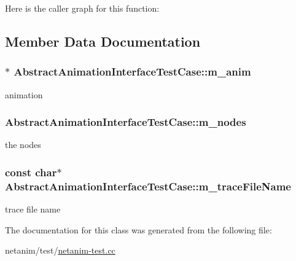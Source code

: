 Here is the caller graph for this function\+:




\subsection{Member Data Documentation}
\subsubsection[{\texorpdfstring{m\+\_\+anim}{m_anim}}]{$\ast$ Abstract\+Animation\+Interface\+Test\+Case\+::m\+\_\+anim\hspace{0.3cm}{\ttfamily [protected]}}\hypertarget{classAbstractAnimationInterfaceTestCase_a88244a79a411132a7ffe535ee8d582a2}{}\label{classAbstractAnimationInterfaceTestCase_a88244a79a411132a7ffe535ee8d582a2}


animation 

\subsubsection[{\texorpdfstring{m\+\_\+nodes}{m_nodes}}]{ Abstract\+Animation\+Interface\+Test\+Case\+::m\+\_\+nodes\hspace{0.3cm}{\ttfamily [protected]}}\hypertarget{classAbstractAnimationInterfaceTestCase_aa051bd1bbd7f335a863a168c27167b38}{}\label{classAbstractAnimationInterfaceTestCase_aa051bd1bbd7f335a863a168c27167b38}


the nodes 

\subsubsection[{\texorpdfstring{m\+\_\+trace\+File\+Name}{m_traceFileName}}]{\setlength{\rightskip}{0pt plus 5cm}const char$\ast$ Abstract\+Animation\+Interface\+Test\+Case\+::m\+\_\+trace\+File\+Name\hspace{0.3cm}{\ttfamily [private]}}\hypertarget{classAbstractAnimationInterfaceTestCase_a8ca75c3705c912ec58c2302c9137f3b4}{}\label{classAbstractAnimationInterfaceTestCase_a8ca75c3705c912ec58c2302c9137f3b4}


trace file name 



The documentation for this class was generated from the following file\+:\begin{DoxyCompactItemize}
\item 
netanim/test/\hyperlink{netanim-test_8cc}{netanim-\/test.\+cc}\end{DoxyCompactItemize}
